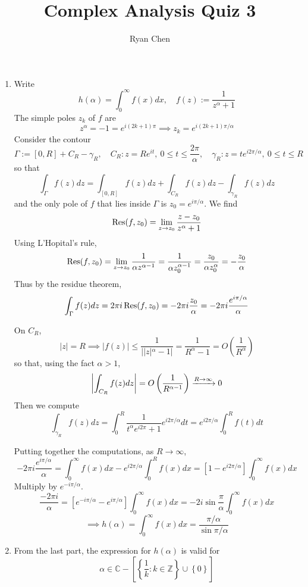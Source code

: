 \documentclass{article}
\title{Complex Analysis Quiz 3}
\author{Ryan Chen}
\def\mbb#1{\mathbb{#1}}
\def\bC{\mbb{C}}
\def\bZ{\mbb{Z}}
\newcommand{\br}[1]{\left(#1\right)}
\newcommand{\sbr}[1]{\left[#1\right]}
\newcommand{\brc}[1]{\left\{#1\right\}}
\newcommand{\imp}{\implies}
\begin{document}
	
\maketitle



\begin{enumerate}
	
\item Write
$$h(\alpha) = \int_0^\infty f(x)dx,
\quad f(z) := \frac{1}{z^\alpha+1}$$
The simple poles $z_k$ of $f$ are
$$z^\alpha = -1 = e^{i(2k+1)\pi}
\imp z_k = e^{i(2k+1)\pi/\alpha}$$
Consider the contour
$$\Gamma := [0,R] + C_R - \gamma_R,
\quad C_R: z=Re^{it},~0\le t\le\frac{2\pi}{\alpha},
\quad \gamma_R: z=te^{i2\pi/\alpha},~0\le t\le R$$
so that
$$\int_\Gamma f(z)dz = \int_{[0,R]}f(z)dz + \int_{C_R}f(z)dz - \int_{\gamma_R}f(z)dz$$
and the only pole of $f$ that lies inside $\Gamma$ is $z_0=e^{i\pi/\alpha}$. We find
$$\Res(f,z_0) = \lim_{z\to z_0}\frac{z-z_0}{z^\alpha+1}$$
Using L'Hopital's rule,
$$\Res(f,z_0) = \lim_{z\to z_0}\frac{1}{\alpha z^{\alpha-1}}
= \frac{1}{\alpha z_0^{\alpha-1}}
= \frac{z_0}{\alpha z_0^\alpha}
= -\frac{z_0}{\alpha}$$
Thus by the residue theorem,
$$\int_\Gamma f(z)dz = 2\pi i\Res(f,z_0)
= -2\pi i\frac{z_0}{\alpha}
= -2\pi i\frac{e^{i\pi/\alpha}}{\alpha}$$

On $C_R$,
$$|z| = R
\imp |f(z)| \le \frac{1}{||z|^\alpha-1|}
= \frac{1}{R^\alpha-1}
= O\br{\frac{1}{R^\alpha}}$$
so that, using the fact $\alpha>1$,
$$\abs{\int_{C_R}f(z)dz} = O\br{\frac{1}{R^{\alpha-1}}}
\app[R][\infty] 0$$
Then we compute
$$\int_{\gamma_R}f(z)dz = \int_0^R\frac{1}{t^\alpha e^{i2\pi}+1}e^{i2\pi/\alpha}dt
= e^{i2\pi/\alpha}\int_0^R f(t)dt$$

Putting together the computations, as $R\to\infty$,
$$-2\pi i\frac{e^{i\pi/\alpha}}{\alpha} = \int_0^\infty f(x)dx - e^{i2\pi/\alpha}\int_0^R f(x)dx
= \sbr{1 - e^{i2\pi/\alpha}}\int_0^\infty f(x)dx$$
Multiply by $e^{-i\pi/\alpha}$.
$$\frac{-2\pi i}{\alpha} = \sbr{e^{-i\pi/\alpha} - e^{i\pi/\alpha}}\int_0^\infty f(x)dx
= -2i\sin\frac\pi\alpha\int_0^\infty f(x)dx$$
$$\imp h(\alpha) = \int_0^\infty f(x)dx = \frac{\pi/\alpha}{\sin\pi/\alpha}$$


\item From the last part, the expression for $h(\alpha)$ is valid for
$$\alpha\in\bC-\sbr{\brc{\frac1k:k\in\bZ}\cup\brc0}$$

\end{enumerate}


	
\end{document}
